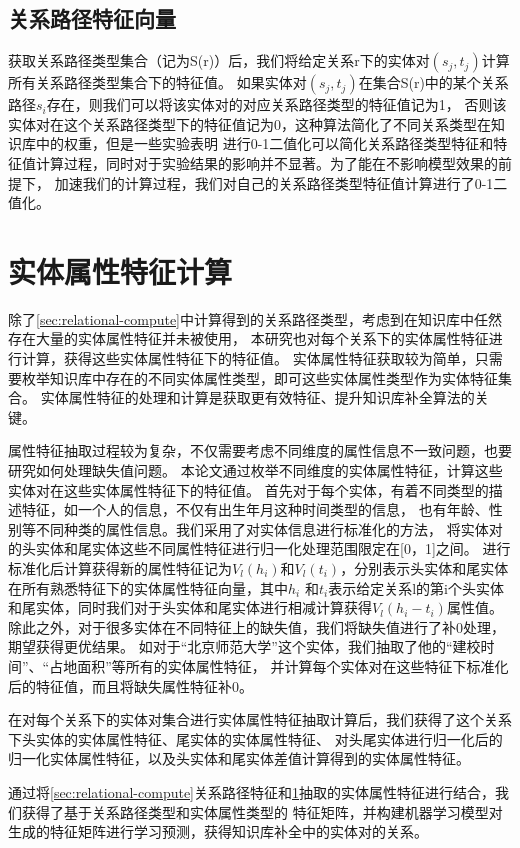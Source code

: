 \subsection{关系路径特征向量}
获取关系路径类型集合（记为S(r)）后，我们将给定关系r下的实体对$(s_j,t_j)$计算所有关系路径类型集合下的特征值。
如果实体对$(s_j,t_j)$在集合S(r)中的某个关系路径$s_i$存在，则我们可以将该实体对的对应关系路径类型的特征值记为1，
否则该实体对在这个关系路径类型下的特征值记为0，这种算法简化了不同关系类型在知识库中的权重，但是一些实验表明\cite{Gardner2014}
进行0-1二值化可以简化关系路径类型特征和特征值计算过程，同时对于实验结果的影响并不显著。为了能在不影响模型效果的前提下，
加速我们的计算过程，我们对自己的关系路径类型特征值计算进行了0-1二值化。

\section{实体属性特征计算}
\label{sec:literal-compute}
除了\ref{sec:relational-compute}中计算得到的关系路径类型，考虑到在知识库中任然存在大量的实体属性特征并未被使用，
本研究也对每个关系下的实体属性特征进行计算，获得这些实体属性特征下的特征值。
实体属性特征获取较为简单，只需要枚举知识库中存在的不同实体属性类型，即可这些实体属性类型作为实体特征集合。
实体属性特征的处理和计算是获取更有效特征、提升知识库补全算法的关键。

属性特征抽取过程较为复杂，不仅需要考虑不同维度的属性信息不一致问题，也要研究如何处理缺失值问题。
本论文通过枚举不同维度的实体属性特征，计算这些实体对在这些实体属性特征下的特征值。
首先对于每个实体，有着不同类型的描述特征，如一个人的信息，不仅有出生年月这种时间类型的信息，
也有年龄、性别等不同种类的属性信息。我们采用了对实体信息进行标准化的方法，
将实体对的头实体和尾实体这些不同属性特征进行归一化处理范围限定在[0，1]之间。
进行标准化后计算获得新的属性特征记为$V_l(h_i)$和$V_l (t_i)$，分别表示头实体和尾实体在所有熟悉特征下的实体属性特征向量，其中$h_i$ 和$t_i$表示给定关系l的第i个头实体和尾实体，同时我们对于头实体和尾实体进行相减计算获得$V_l(h_i-t_i )$属性值。除此之外，对于很多实体在不同特征上的缺失值，我们将缺失值进行了补0处理，期望获得更优结果。
如对于“北京师范大学”这个实体，我们抽取了他的“建校时间”、“占地面积”等所有的实体属性特征，
并计算每个实体对在这些特征下标准化后的特征值，而且将缺失属性特征补0。

在对每个关系下的实体对集合进行实体属性特征抽取计算后，我们获得了这个关系下头实体的实体属性特征、尾实体的实体属性特征、
对头尾实体进行归一化后的归一化实体属性特征，以及头实体和尾实体差值计算得到的实体属性特征。

通过将\ref{sec:relational-compute}关系路径特征和\ref{sec:literal-compute}抽取的实体属性特征进行结合，我们获得了基于关系路径类型和实体属性类型的
特征矩阵，并构建机器学习模型对生成的特征矩阵进行学习预测，获得知识库补全中的实体对的关系。

